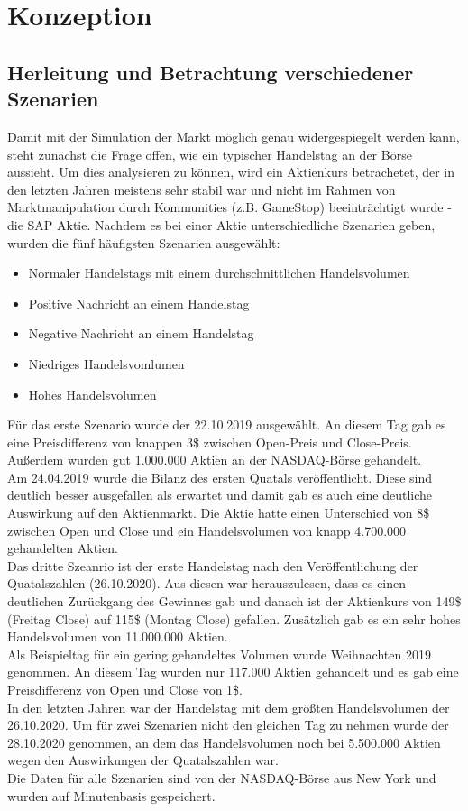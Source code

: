\chapter{Konzeption}
\section{Herleitung und Betrachtung verschiedener Szenarien}
Damit mit der Simulation der Markt möglich genau widergespiegelt werden kann, steht zunächst die Frage offen,
wie ein typischer Handelstag an der Börse aussieht. Um dies analysieren zu können, wird ein Aktienkurs betrachetet, 
der in den letzten Jahren meistens sehr stabil war und nicht im Rahmen von Marktmanipulation durch Kommunities 
(z.B. GameStop) beeinträchtigt wurde - die SAP Aktie. Nachdem es bei einer Aktie unterschiedliche Szenarien geben, 
wurden die fünf häufigsten Szenarien ausgewählt:
\begin{itemize}
    \item Normaler Handelstags mit einem durchschnittlichen Handelsvolumen
    \item Positive Nachricht an einem Handelstag
    \item Negative Nachricht an einem Handelstag
    \item Niedriges Handelsvomlumen 
    \item Hohes Handelsvolumen
\end{itemize}
Für das erste Szenario wurde der 22.10.2019 ausgewählt. An diesem Tag gab es eine Preisdifferenz von knappen 3\$ 
zwischen Open-Preis und Close-Preis. Außerdem wurden gut 1.000.000 Aktien an der NASDAQ-Börse gehandelt. \\
Am 24.04.2019 wurde die Bilanz des ersten Quatals veröffentlicht. Diese sind deutlich besser ausgefallen als erwartet 
und damit gab es auch eine deutliche Auswirkung auf den Aktienmarkt. Die Aktie hatte einen Unterschied von 8\$ zwischen 
Open und Close und ein Handelsvolumen von knapp 4.700.000 gehandelten Aktien. \\
Das dritte Szeanrio ist der erste Handelstag nach den Veröffentlichung der Quatalszahlen (26.10.2020). Aus diesen war 
herauszulesen, dass es einen deutlichen Zurückgang des Gewinnes gab und danach ist der Aktienkurs von 149\$ (Freitag Close) 
auf 115\$ (Montag Close) gefallen. Zusätzlich gab es ein sehr hohes Handelsvolumen von 11.000.000 Aktien. \\
Als Beispieltag für ein gering gehandeltes Volumen wurde Weihnachten 2019 genommen. An diesem Tag wurden nur 117.000 Aktien gehandelt 
und es gab eine Preisdifferenz von Open und Close von 1\$. \\
In den letzten Jahren war der Handelstag mit dem größten Handelsvolumen der 26.10.2020. Um für zwei Szenarien nicht den gleichen 
Tag zu nehmen wurde der 28.10.2020 genommen, an dem das Handelsvolumen noch bei 5.500.000 Aktien wegen den Auswirkungen der 
Quatalszahlen war. \\
Die Daten für alle Szenarien sind von der NASDAQ-Börse aus New York und wurden auf Minutenbasis gespeichert. 
